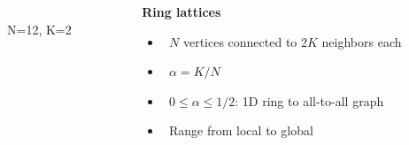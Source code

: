 \documentclass[serif,mathserif]{beamer}
\begin{document}
\begin{frame}
    \begin{columns}
        \begin{column}{.5\textwidth}
            \\
            \vspace{0.1cm}
            N=12, K=2
        \end{column}
        \begin{column}{.5\textwidth}
            \textbf{Ring lattices}
            \begin{itemize}
                \vspace{0.25cm}
                \item \ \pause $N$ vertices connected to $2K$ neighbors each
                \vspace{0.25cm}
                \item \ \pause $\alpha = K/N$
                \vspace{0.25cm}
                \item \ \pause $0 \leq \alpha \leq 1/2$: 1D ring to all-to-all graph
                \vspace{0.25cm}
                \item \ \pause Range from local to global
            \end{itemize}
        \end{column}
    \end{columns}
\end{frame}
\end{document}

